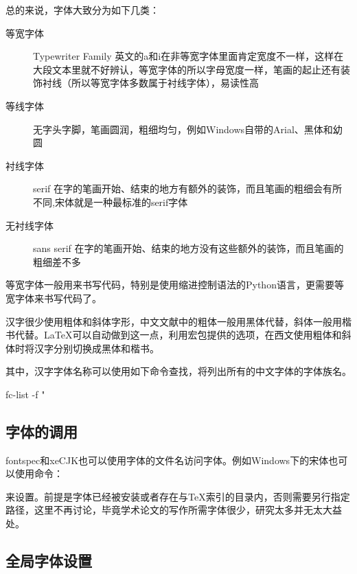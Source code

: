 {总的来说，字体大致分为如下几类：

\begin{description}
    \item[等宽字体] Typewriter Family 英文的a和i在非等宽字体里面肯定宽度不一样，这样在大段文本里就不好辨认，等宽字体的所以字母宽度一样，笔画的起止还有装饰衬线（所以等宽字体多数属于衬线字体），易读性高
    \item[等线字体] 无字头字脚，笔画圆润，粗细均匀，例如Windows自带的Arial、黑体和幼圆
    \item[衬线字体] serif 在字的笔画开始、结束的地方有额外的装饰，而且笔画的粗细会有所不同,宋体就是一种最标准的serif字体
    \item[无衬线字体] sans serif 在字的笔画开始、结束的地方没有这些额外的装饰，而且笔画的粗细差不多
\end{description}

等宽字体一般用来书写代码，特别是使用缩进控制语法的Python语言，更需要等宽字体来书写代码了。

汉字很少使用粗体和斜体字形，中文文献中的粗体一般用黑体代替，斜体一般用楷书代替。\LaTeX{}可以自动做到这一点，利用宏包提供的选项，在西文使用粗体和斜体时将汉字分别切换成黑体和楷书。

\begin{latex}
\end{latex}

其中，汉字字体名称可以使用如下命令查找，将列出所有的中文字体的字体族名。

\begin{basiccode}
fc-list -f "%
\end{basiccode}

\subsection{字体的调用}

fontspec和xeCJK也可以使用字体的文件名访问字体。例如Windows下的宋体也可以使用命令：
\begin{latex}
\end{latex}
来设置。前提是字体已经被安装或者存在与\TeX{}索引的目录内，否则需要另行指定路径，这里不再讨论，毕竟学术论文的写作所需字体很少，研究太多并无太大益处。

\subsection{全局字体设置}

}
